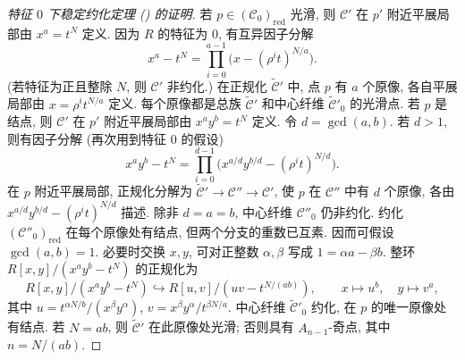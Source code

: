 \begin{proof}[特征 $0$ 下稳定约化定理 () 的证明]
若 $p\in(\mathcal C_0)_{\mathrm{red}}$ 光滑, 则 $\mathcal C'$ 在 $p'$ 附近平展局部由 $x^a=t^N$ 定义. 因为 $R$ 的特征为 $0$, 有互异因子分解
\[
x^a-t^N=\prod_{i=0}^{a-1}\bigl(x-(\rho^it)^{N/a}\bigr).
\]
(若特征为正且整除 $N$, 则 $\mathcal C'$ 非约化.) 在正规化 $\widetilde{\mathcal C}'$ 中, 点 $p$ 有 $a$ 个原像, 各自平展局部由 $x=\rho^it^{N/a}$ 定义. 每个原像都是总族 $\widetilde{\mathcal C}'$ 和中心纤维 $\widetilde{\mathcal C}'_0$ 的光滑点. 若 $p$ 是结点, 则 $\mathcal C'$ 在 $p'$ 附近平展局部由 $x^ay^b=t^N$ 定义. 令 $d=\gcd(a,\allowbreak b)$. 若 $d>1$, 则有因子分解 (再次用到特征 $0$ 的假设)
\[
x^ay^b-t^N=\prod_{i=0}^{d-1}\bigl(x^{a/d}y^{b/d}-(\rho^it)^{N/d}\bigr).
\]
在 $p$ 附近平展局部, 正规化分解为 $\widetilde{\mathcal C}'\to\mathcal C''\to\mathcal C'$, 使 $p$ 在 $\mathcal C''$ 中有 $d$ 个原像, 各由 $x^{a/d}y^{b/d}-(\rho^it)^{N/d}$ 描述. 除非 $d=a=b$, 中心纤维 $\mathcal C''_0$ 仍非约化. 约化 $(\mathcal C''_0)_{\mathrm{red}}$ 在每个原像处有结点, 但两个分支的重数已互素. 因而可假设 $\gcd(a,\allowbreak b)=1$. 必要时交换 $x,\allowbreak y$, 可对正整数 $\alpha,\allowbreak \beta$ 写成 $1=\alpha a-\beta b$. 整环 $R[x,\allowbreak y]/(x^ay^b-t^N)$ 的正规化为
\[
R[x,y]/(x^ay^b-t^N)\hookrightarrow R[u,v]/(uv-t^{N/(ab)}),
\qquad x\mapsto u^b,\quad y\mapsto v^a,
\]
其中 $u=t^{\alpha N/b}/(x^\beta y^\alpha)$, $v=x^\beta y^\alpha/t^{\beta N/a}$. 中心纤维 $\widetilde{\mathcal C}'_0$ 约化, 在 $p$ 的唯一原像处有结点. 若 $N=ab$, 则 $\widetilde{\mathcal C}'$ 在此原像处光滑; 否则具有 $A_{n-1}$-奇点, 其中 $n=N/(ab)$.


\end{proof}
